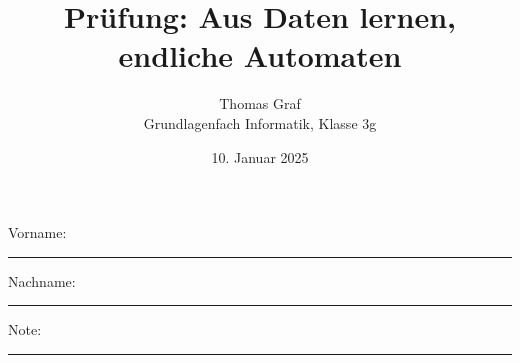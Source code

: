 \newtoggle{withbonus} \toggletrue{withbonus} %

\newcommand{\mycourse}{Grundlagenfach Informatik}
\newcommand{\myclass}{Klasse 3g}
\newcommand{\mydate}{10. Januar 2025}

\title{\textbf{Prüfung: Aus Daten lernen, endliche Automaten}}
\author{Thomas Graf\\
	\mycourse, \myclass}
\date{\mydate}
\maketitle
\thispagestyle{headandfoot}

\begin{center}
\end{center}
\vspace{10mm}

\begin{center}
	Vorname: \rule{45mm}{0.8pt}\qquad Nachname: \rule{45mm}{0.8pt}
\end{center}
\vspace{20mm}

\begin{center}
	\iftoggle{withbonus} {
		\combinedgradetable[h][questions]
	} {
		\gradetable[h][questions]
	}
\end{center}
\vspace{15mm}
\begin{center}
	Note:
	\vspace{10mm}

	\rule{8mm}{1.2pt}
\end{center}
\clearpage

